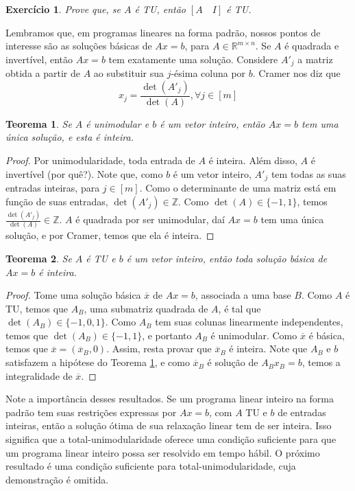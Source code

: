 \documentclass[]{article}
\newtheorem{teorema}{Teorema}
\newtheorem{exercicio}{Exercício}
\numberwithin{equation}{section}
\begin{document}
\begin{exercicio}
  Prove que, se $A$ é TU, então $[A \quad I]$ é TU.
\end{exercicio}

Lembramos que, em programas lineares na forma padrão, nossos pontos de interesse são as soluções básicas
de $Ax = b$, para $A \in \mathbb{R}^{m \times n}$.
Se $A$ é quadrada e invertível, então $Ax = b$ tem exatamente uma solução.
Considere $A'_j$ a matriz obtida a partir de $A$ ao substituir sua $j$-ésima coluna por $b$.
Cramer nos diz que
$$
x_j = \frac{\det(A'_j)}{\det(A)}, \forall j \in [m]
$$

\begin{teorema} \label{unimodularTheorem}
  Se $A$ é unimodular e $b$ é um vetor inteiro, então $Ax = b$ tem uma única solução, e esta é inteira.
\end{teorema}

\begin{proof}
  Por unimodularidade, toda entrada de $A$ é inteira.
  Além disso, $A$ é invertível (por quê?).
  Note que, como $b$ é um vetor inteiro, $A'_j$ tem todas as suas entradas inteiras, para $j \in [m]$.
  Como o determinante de uma matriz está em função de suas entradas, $\det(A'_j) \in \mathbb{Z}$.
  Como $\det(A) \in \{-1, 1\}$, temos $\frac{\det(A'_j)}{\det(A)} \in \mathbb{Z}$.
  $A$ é quadrada por ser unimodular, daí $Ax = b$ tem uma única solução, e por Cramer, temos que ela é
  inteira.
\end{proof}

\begin{teorema}
  Se $A$ é TU e $b$ é um vetor inteiro, então toda solução básica de $Ax = b$ é inteira.
\end{teorema}

\begin{proof}
  Tome uma solução básica $\overline{x}$ de $Ax = b$, associada a uma base $B$.
  Como $A$ é TU, temos que $A_B$, uma submatriz quadrada de $A$, é tal que $\det(A_B) \in \{-1, 0, 1\}$.
  Como $A_B$ tem suas colunas linearmente independentes, temos que $\det(A_B) \in \{-1, 1\}$, e portanto
  $A_B$ é unimodular.
  Como $\overline{x}$ é básica, temos que $\overline{x} = (\overline{x}_B, 0)$.
  Assim, resta provar que $\overline{x}_B$ é inteira.
  Note que $A_B$ e $b$ satisfazem a hipótese do Teorema \ref{unimodularTheorem}, e como $\overline{x}_B$
  é solução de $A_Bx_B = b$, temos a integralidade de $\overline{x}$.
\end{proof}

Note a importância desses resultados.
Se um programa linear inteiro na forma padrão tem suas restrições expressas por $Ax = b$, com $A$ TU e
$b$ de entradas inteiras, então a solução ótima de sua relaxação linear tem de ser inteira.
Isso significa que a total-unimodularidade oferece uma condição suficiente para que um programa linear
inteiro possa ser resolvido em tempo hábil.
O próximo resultado é uma condição suficiente para total-unimodularidade, cuja demonstração é omitida.
\end{document}
